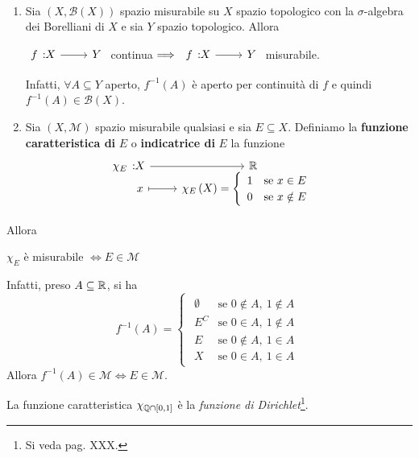 \begin{examples}~{}
	\begin{enumerate}
		\item Sia $\left(X,\mathcal{B}\left(X\right)\right)$ spazio misurabile su $X$ spazio topologico con la $\sigma$-algebra dei Borelliani di $X$ e sia $Y$ spazio topologico. Allora
		\begin{center}
			$\funz{f}{X}{Y}$ continua$\implies \funz{f}{X}{Y}$ misurabile.
		\end{center}
	Infatti, $\forall A\subseteq Y$ aperto, $f^{-1}\left(A\right)$ è aperto per continuità di $f$ e quindi $f^{-1}\left(A\right)\in\mathcal{B}\left(X\right)$.
	\item Sia $\left(X,\mathcal{M}\right)$ spazio misurabile qualsiasi e sia $E\subseteq X$. Definiamo la \textbf{funzione caratteristica di} $E$ o \textbf{indicatrice di} $E$ la funzione
	\begin{equation}
		\funztot{\chi_E}{X}{\realset}{x}{\chi_E\left(X\right)=\begin{cases}
				\begin{array}{ll}
					1&\text{se }x\in E\\
					0&\text{se }x\notin E\\
				\end{array}
		\end{cases}}
	\end{equation}
	\end{enumerate}
	Allora
	\begin{center}
		$\chi_E$ è misurabile $\iff E\in\mathcal{M}$
	\end{center}
Infatti, preso $A\subseteq \mathbb{R}$, si ha
\begin{equation*}
	f^{-1}\left(A\right)=\begin{cases}
		\begin{array}{ll}
			\emptyset&\text{se }0\notin A,\ 1\notin A\\
			E^C&\text{se }0\in A,\ 1\notin A\\
			E&\text{se }0\notin A,\ 1\in A\\
			X&\text{se }0\in A,\ 1\in A
		\end{array}
	\end{cases}
\end{equation*}
Allora $f^{-1}\left(A\right)\in\mathcal{M}\iff E\in\mathcal{M}$.
\end{examples}
\begin{observe}
	La funzione caratteristica $\chi_{\mathbb{Q}\cap\left[0,1\right]}$ è la \textit{funzione di Dirichlet}\footnote{Si veda pag. XXX.}.
\end{observe}
